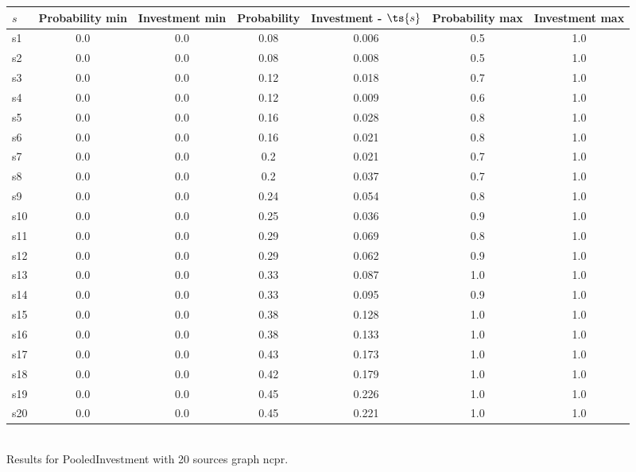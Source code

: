 \documentclass{article}
\begin{document}
\noindent\begin{tabular}{|l|c|c|c|c|c|c|}
\hline
$s$& Probability min & Investment min & Probability & Investment - $\ts{s}$ & Probability max & Investment max\\
\hline
s1 &0.0 & 0.0 & 0.08 & 0.006 & 0.5 & 1.0\\
\hline
s2 &0.0 & 0.0 & 0.08 & 0.008 & 0.5 & 1.0\\
\hline
s3 &0.0 & 0.0 & 0.12 & 0.018 & 0.7 & 1.0\\
\hline
s4 &0.0 & 0.0 & 0.12 & 0.009 & 0.6 & 1.0\\
\hline
s5 &0.0 & 0.0 & 0.16 & 0.028 & 0.8 & 1.0\\
\hline
s6 &0.0 & 0.0 & 0.16 & 0.021 & 0.8 & 1.0\\
\hline
s7 &0.0 & 0.0 & 0.2 & 0.021 & 0.7 & 1.0\\
\hline
s8 &0.0 & 0.0 & 0.2 & 0.037 & 0.7 & 1.0\\
\hline
s9 &0.0 & 0.0 & 0.24 & 0.054 & 0.8 & 1.0\\
\hline
s10 &0.0 & 0.0 & 0.25 & 0.036 & 0.9 & 1.0\\
\hline
s11 &0.0 & 0.0 & 0.29 & 0.069 & 0.8 & 1.0\\
\hline
s12 &0.0 & 0.0 & 0.29 & 0.062 & 0.9 & 1.0\\
\hline
s13 &0.0 & 0.0 & 0.33 & 0.087 & 1.0 & 1.0\\
\hline
s14 &0.0 & 0.0 & 0.33 & 0.095 & 0.9 & 1.0\\
\hline
s15 &0.0 & 0.0 & 0.38 & 0.128 & 1.0 & 1.0\\
\hline
s16 &0.0 & 0.0 & 0.38 & 0.133 & 1.0 & 1.0\\
\hline
s17 &0.0 & 0.0 & 0.43 & 0.173 & 1.0 & 1.0\\
\hline
s18 &0.0 & 0.0 & 0.42 & 0.179 & 1.0 & 1.0\\
\hline
s19 &0.0 & 0.0 & 0.45 & 0.226 & 1.0 & 1.0\\
\hline
s20 &0.0 & 0.0 & 0.45 & 0.221 & 1.0 & 1.0\\
\hline
\end{tabular}\\

\noindent Results for PooledInvestment with 20 sources graph ncpr.
\end{document}
